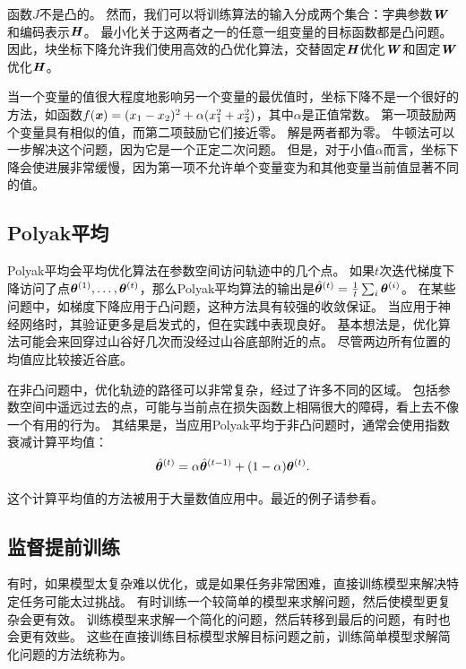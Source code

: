 函数$J$不是凸的。
然而，我们可以将训练算法的输入分成两个集合：字典参数$\boldsymbol{\mathit{W}}$和编码表示$\boldsymbol{\mathit{H}}$。
最小化关于这两者之一的任意一组变量的目标函数都是凸问题。
因此，块坐标下降允许我们使用高效的凸优化算法，交替固定$\boldsymbol{\mathit{H}}$优化$\boldsymbol{\mathit{W}}$和固定$\boldsymbol{\mathit{W}}$优化$\boldsymbol{\mathit{H}}$。

当一个变量的值很大程度地影响另一个变量的最优值时，坐标下降不是一个很好的方法，如函数$f(\boldsymbol{\mathit{x}})=(x_1 - x_2)^2+\alpha(x_1^2 + x_2^2)$，其中$\alpha$是正值常数。
第一项鼓励两个变量具有相似的值，而第二项鼓励它们接近零。
解是两者都为零。
牛顿法可以一步解决这个问题，因为它是一个正定二次问题。
但是，对于小值$\alpha$而言，坐标下降会使进展非常缓慢，因为第一项不允许单个变量变为和其他变量当前值显著不同的值。


\subsection{Polyak平均}
\label{sec:polyak_averaging}
Polyak平均\citep{Polyak+Juditsky-1992}会平均优化算法在参数空间访问轨迹中的几个点。
如果$t$次迭代梯度下降访问了点$\boldsymbol{\theta}^{(1)},\dots,\boldsymbol{\theta}^{(t)}$，那么Polyak平均算法的输出是$\hat{\boldsymbol{\theta}}^{(t)} = \frac{1}{t} \sum_i \boldsymbol{\theta}^{(i)}$。
在某些问题中，如梯度下降应用于凸问题，这种方法具有较强的收敛保证。
当应用于神经网络时，其验证更多是启发式的，但在实践中表现良好。
基本想法是，优化算法可能会来回穿过山谷好几次而没经过山谷底部附近的点。
尽管两边所有位置的均值应比较接近谷底。


在非凸问题中，优化轨迹的路径可以非常复杂，经过了许多不同的区域。
包括参数空间中遥远过去的点，可能与当前点在损失函数上相隔很大的障碍，看上去不像一个有用的行为。
其结果是，当应用Polyak平均于非凸问题时，通常会使用指数衰减计算平均值：
\begin{equation}
    \hat{\boldsymbol{\theta}}^{(t)} = \alpha \hat{\boldsymbol{\theta}}^{(t-1)} + (1-\alpha) \boldsymbol{\theta}^{(t)} .
\end{equation}

这个计算平均值的方法被用于大量数值应用中。最近的例子请参看\cite{Szegedy-et-al-2015}。

\subsection{监督提前训练}
\label{sec:supervised_pretraining}
有时，如果模型太复杂难以优化，或是如果任务非常困难，直接训练模型来解决特定任务可能太过挑战。
有时训练一个较简单的模型来求解问题，然后使模型更复杂会更有效。
训练模型来求解一个简化的问题，然后转移到最后的问题，有时也会更有效些。
这些在直接训练目标模型求解目标问题之前，训练简单模型求解简化问题的方法统称为。


